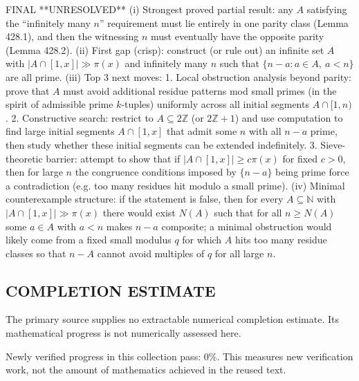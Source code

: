 FINAL
**UNRESOLVED**
(i) Strongest proved partial result: any $A$ satisfying the “infinitely many $n$” requirement must lie entirely in one parity class (Lemma 428.1), and then the witnessing $n$ must eventually have the opposite parity (Lemma 428.2).
(ii) First gap (crisp): construct (or rule out) an infinite set $A$ with $|A\cap[1,x]|\gg \pi(x)$ and infinitely many $n$ such that $\{n-a: a\in A,\ a<n\}$ are all prime.
(iii) Top 3 next moves:
  1. Local obstruction analysis beyond parity: prove that $A$ must avoid additional residue patterns mod small primes (in the spirit of admissible prime $k$-tuples) uniformly across all initial segments $A\cap[1,n)$.
  2. Constructive search: restrict to $A\subseteq 2\mathbb Z$ (or $2\mathbb Z+1$) and use computation to find large initial segments $A\cap[1,x]$ that admit some $n$ with all $n-a$ prime, then study whether these initial segments can be extended indefinitely.
  3. Sieve-theoretic barrier: attempt to show that if $|A\cap[1,x]|\ge c\pi(x)$ for fixed $c>0$, then for large $n$ the congruence conditions imposed by $\{n-a\}$ being prime force a contradiction (e.g. too many residues hit modulo a small prime).
(iv) Minimal counterexample structure: if the statement is false, then for every $A\subseteq\mathbb N$ with $|A\cap[1,x]|\gg \pi(x)$ there would exist $N(A)$ such that for all $n\ge N(A)$ some $a\in A$ with $a<n$ makes $n-a$ composite; a minimal obstruction would likely come from a fixed small modulus $q$ for which $A$ hits too many residue classes so that $n-A$ cannot avoid multiples of $q$ for all large $n$.




\subsection*{COMPLETION ESTIMATE}
The primary source supplies no extractable numerical completion estimate. Its mathematical progress is not numerically assessed here.

Newly verified progress in this collection pass: $0\%$. This measures new verification work, not the amount of mathematics achieved in the reused text.
